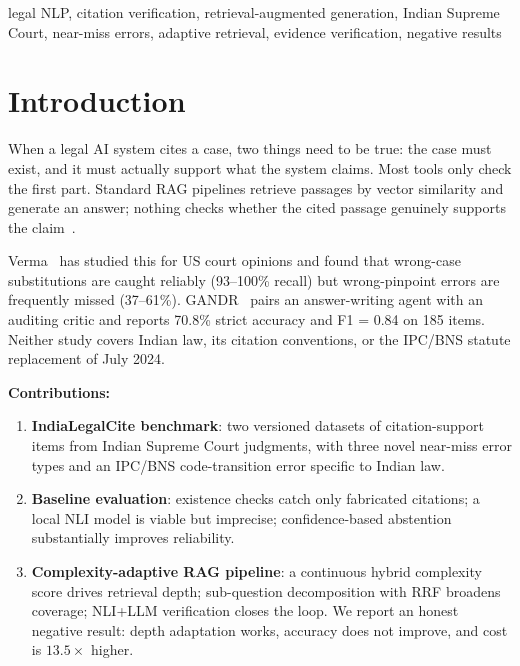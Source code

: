 \documentclass[conference]{IEEEtran}
\begin{document}
\begin{IEEEkeywords}
legal NLP, citation verification, retrieval-augmented generation, Indian Supreme Court,
near-miss errors, adaptive retrieval, evidence verification, negative results
\end{IEEEkeywords}

\section{Introduction}
\label{sec:intro}

When a legal AI system cites a case, two things need to be true: the case must exist, and it must
actually support what the system claims. Most tools only check the first part. Standard RAG
pipelines retrieve passages by vector similarity and generate an answer; nothing checks whether the
cited passage genuinely supports the claim~\cite{magesh2025hallucination}.

Verma~\cite{verma2026citation} has studied this for US court opinions and found that wrong-case
substitutions are caught reliably (93--100\% recall) but wrong-pinpoint errors are frequently
missed (37--61\%). GANDR~\cite{qian2026gandr} pairs an answer-writing agent with an auditing critic
and reports 70.8\% strict accuracy and F1 = 0.84 on 185 items. Neither study covers Indian law,
its citation conventions, or the IPC/BNS statute replacement of July 2024.

\textbf{Contributions:}
\begin{enumerate}
\item \textbf{IndiaLegalCite benchmark}: two versioned datasets of citation-support items from
  Indian Supreme Court judgments, with three novel near-miss error types and an IPC/BNS
  code-transition error specific to Indian law.
\item \textbf{Baseline evaluation}: existence checks catch only fabricated citations; a local
  NLI model is viable but imprecise; confidence-based abstention substantially improves reliability.
\item \textbf{Complexity-adaptive RAG pipeline}: a continuous hybrid complexity score drives
  retrieval depth; sub-question decomposition with RRF broadens coverage; NLI+LLM verification
  closes the loop. We report an honest negative result: depth adaptation works, accuracy does not
  improve, and cost is $13.5\times$ higher.
\end{enumerate}

\end{document}
